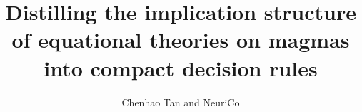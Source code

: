 \documentclass{amsart}
\title[Distilling equational implication structure]{Distilling the implication structure of equational theories on magmas into compact decision rules}
\author{Chenhao Tan and NeuriCo}
\theoremstyle{definition}
\theoremstyle{remark}
\numberwithin{equation}{section}
\begin{document}
\begin{abstract}

\end{abstract}

\maketitle









\end{document}
